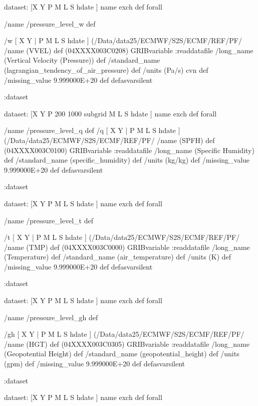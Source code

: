 \begin{ingrid}
{dataset:
[X Y P M L S hdate ] {name exch def } forall

/name /pressure_level_w def

/w { [ X Y | P M L S hdate ] (/Data/data25/ECMWF/S2S/ECMF/REF/PF/%
/name (VVEL) def
(04XXXX003C0208) GRIBvariable
:readdatafile
/long_name (Vertical Velocity (Pressure)) def
/standard_name (lagrangian_tendency_of_air_pressure) def
/units (Pa/s) cvn def
/missing_value 9.999000E+20 def
} defasvarsilent

:dataset

dataset:
[X Y 
P  200 1000 subgrid
M L S hdate ] {name exch def } forall


/name /pressure_level_q def
/q { [ X Y | P M L S hdate ] (/Data/data25/ECMWF/S2S/ECMF/REF/PF/%
/name (SPFH) def
(04XXXX003C0100) GRIBvariable
:readdatafile
/long_name (Specific Humidity) def
/standard_name (specific_humidity) def
/units (kg/kg) def
/missing_value 9.999000E+20 def
} defasvarsilent

:dataset

dataset:
[X Y P M L S hdate ] {name exch def } forall

/name /pressure_level_t def

/t { [ X Y | P M L S hdate ] (/Data/data25/ECMWF/S2S/ECMF/REF/PF/%
/name (TMP) def
(04XXXX003C0000) GRIBvariable
:readdatafile
/long_name (Temperature) def
/standard_name (air_temperature) def
/units (K) def
/missing_value 9.999000E+20 def
} defasvarsilent

:dataset

dataset:
[X Y P M L S hdate ] {name exch def } forall

/name /pressure_level_gh def

/gh { [ X Y | P M L S hdate ] (/Data/data25/ECMWF/S2S/ECMF/REF/PF/%
/name (HGT) def
(04XXXX003C0305) GRIBvariable
:readdatafile
/long_name (Geopotential Height) def
/standard_name (geopotential_height) def
/units (gpm) def
/missing_value 9.999000E+20 def
} defasvarsilent

:dataset

dataset:
[X Y P M L S hdate ] {name exch def } forall

}
\end{ingrid}
